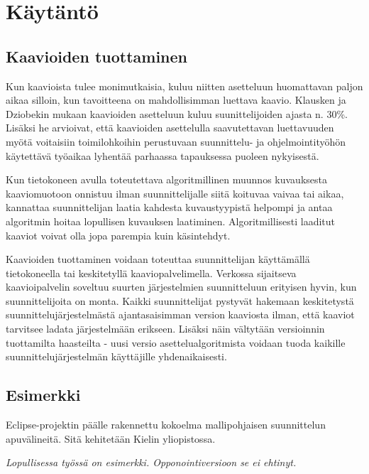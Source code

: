 \documentclass[finnish,12pt]{article}
\begin{document}
	\clearpage
	\section{Käytäntö}

		\subsection{Kaavioiden tuottaminen}

Kun kaavioista tulee monimutkaisia, kuluu niitten asetteluun huomattavan paljon aikaa silloin, kun tavoitteena on mahdollisimman luettava kaavio.
Klausken ja Dziobekin mukaan kaavioiden asetteluun kuluu suunittelijoiden ajasta n. 30\%.
Lisäksi he arvioivat, että kaavioiden asettelulla saavutettavan luettavuuden myötä voitaisiin toimilohkoihin perustuvaan suunnittelu- ja ohjelmointityöhön käytettävä työaikaa lyhentää parhaassa tapauksessa puoleen nykyisestä. \cite{Refworks:63}

Kun tietokoneen avulla toteutettava algoritmillinen muunnos kuvauksesta kaaviomuotoon onnistuu ilman suunnittelijalle siitä koituvaa vaivaa tai aikaa, kannattaa suunnittelijan laatia kahdesta kuvaustyypistä helpompi ja antaa algoritmin hoitaa lopullisen kuvauksen laatiminen.
Algoritmillisesti laaditut kaaviot voivat olla jopa parempia kuin käsintehdyt.

Kaavioiden tuottaminen voidaan toteuttaa suunnittelijan käyttämällä tietokoneella tai keskitetyllä kaaviopalvelimella.
Verkossa sijaitseva kaavioipalvelin soveltuu suurten järjestelmien suunnitteluun erityisen hyvin, kun suunnittelijoita on monta.
Kaikki suunnittelijat pystyvät hakemaan keskitetystä suunnittelujärjestelmästä ajantasaisimman version kaaviosta ilman, että kaaviot tarvitsee ladata järjestelmään erikseen.
Lisäksi näin vältytään versioinnin tuottamilta haasteilta - uusi versio asettelualgoritmista voidaan tuoda kaikille suunnittelujärjestelmän käyttäjille yhdenaikaisesti.

		\subsection{Esimerkki}

Eclipse-projektin päälle rakennettu kokoelma mallipohjaisen suunnittelun apuvälineitä. Sitä kehitetään Kielin yliopistossa.

		\emph{Lopullisessa työssä on esimerkki. Opponointiversioon se ei ehtinyt.}

\end{document}
